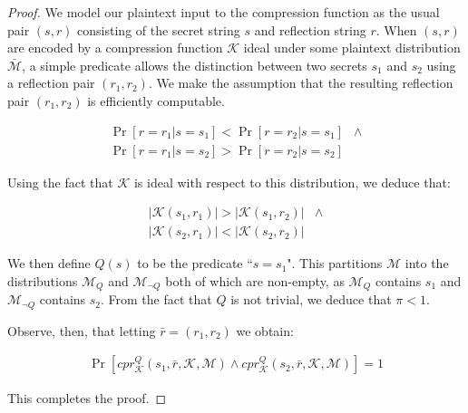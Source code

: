 \begin{proof}
We model our plaintext input to the compression function as the usual pair $(s,
r)$ consisting of the secret string $s$ and reflection string $r$. When $(s, r)$
are encoded by a compression function $\mathcal{K}$ ideal under some plaintext
distribution $\bar{\mathcal{M}}$, a simple predicate allows the distinction
between two secrets $s_1$ and $s_2$ using a reflection pair $(r_1, r_2)$.  We
make the assumption that the resulting reflection pair $(r_1, r_2)$ is
efficiently computable.

\begin{align*}
    \Pr[r = r_1|s = s_1] < \Pr[r = r_2|s = s_1]&\land\\
    \Pr[r = r_1|s = s_2] > \Pr[r = r_2|s = s_2]&
\end{align*}

Using the fact that $\mathcal{K}$ is ideal with respect to this distribution,
we deduce that:

\begin{align*}
    |\mathcal{K}(s_1, r_1)| > |\mathcal{K}(s_1, r_2)|&\land\\
    |\mathcal{K}(s_2, r_1)| < |\mathcal{K}(s_2, r_2)|&
\end{align*}

We then define $Q(s)$ to be the predicate ``$s = s_1$". This partitions
$\mathcal{M}$ into the distributions $\mathcal{M}_Q$ and
$\mathcal{M}_{\lnot Q}$ both of which are non-empty, as $\mathcal{M}_Q$
contains $s_1$ and $\mathcal{M}_{\lnot Q}$ contains $s_2$. From the fact that
$Q$ is not trivial, we deduce that $\pi < 1$.

Observe, then, that letting $\bar{r} = (r_1, r_2)$ we obtain:

\begin{align*}
    \Pr[cpr^Q_{\mathcal{K}}(s_1, \bar{r}, \mathcal{K}, \mathcal{M})
    \land
    cpr^Q_{\mathcal{K}}(s_2, \bar{r}, \mathcal{K}, \mathcal{M})] = 1
\end{align*}

This completes the proof.

\end{proof}

\begin{lemma}
\end{lemma}

